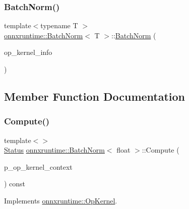 \subsubsection{\texorpdfstring{Batch\+Norm()}{BatchNorm()}}
{\footnotesize\ttfamily template$<$typename T $>$ \\
\mbox{\hyperlink{classonnxruntime_1_1BatchNorm}{onnxruntime\+::\+Batch\+Norm}}$<$ T $>$\+::\mbox{\hyperlink{classonnxruntime_1_1BatchNorm}{Batch\+Norm}} (\begin{DoxyParamCaption}\item[{const \mbox{\hyperlink{classonnxruntime_1_1OpKernelInfo}{Op\+Kernel\+Info}} \&}]{op\+\_\+kernel\+\_\+info }\end{DoxyParamCaption})\hspace{0.3cm}{\ttfamily [inline]}}



\subsection{Member Function Documentation}
\mbox{\label{classonnxruntime_1_1BatchNorm_a2c6b47dac4b310d44eca0d9a6d39bb72}} 
\subsubsection{\texorpdfstring{Compute()}{Compute()}\hspace{0.1cm}{\footnotesize\ttfamily [1/2]}}
{\footnotesize\ttfamily template$<$$>$ \\
\mbox{\hyperlink{classonnxruntime_1_1common_1_1Status}{Status}} \mbox{\hyperlink{classonnxruntime_1_1BatchNorm}{onnxruntime\+::\+Batch\+Norm}}$<$ float $>$\+::Compute (\begin{DoxyParamCaption}\item[{\mbox{\hyperlink{classonnxruntime_1_1OpKernelContext}{Op\+Kernel\+Context}} $\ast$}]{p\+\_\+op\+\_\+kernel\+\_\+context }\end{DoxyParamCaption}) const\hspace{0.3cm}{\ttfamily [virtual]}}



Implements \mbox{\hyperlink{classonnxruntime_1_1OpKernel_a9eca8656a78b1b3ab9d3351a12798650}{onnxruntime\+::\+Op\+Kernel}}.

